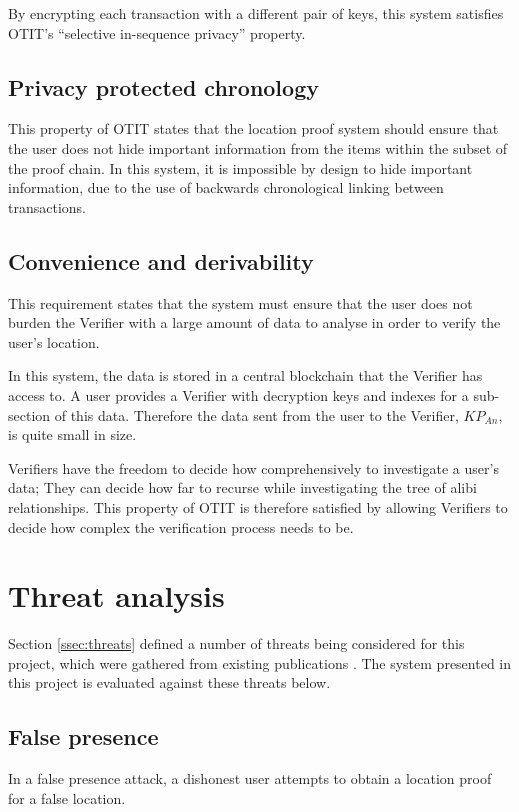 By encrypting each transaction with a different pair of keys, this system satisfies OTIT's ``selective in-sequence privacy'' property.

\subsection{Privacy protected chronology}
This property of OTIT states that the location proof system should ensure that the user does not hide important information from the items within the subset of the proof chain. In this system, it is impossible by design to hide important information, due to the use of backwards chronological linking between transactions. 

\subsection{Convenience and derivability}
This requirement states that the system must ensure that the user does not burden the Verifier with a large amount of data to analyse in order to verify the user's location.

In this system, the data is stored in a central blockchain that the Verifier has access to. A user provides a Verifier  with decryption keys and indexes for a sub-section of this data. Therefore the data sent from the user to the Verifier, $KP_{An}$, is quite small in size.

Verifiers have the freedom to decide how comprehensively to investigate a user's data; They can decide how far to recurse while investigating the tree of alibi relationships. This property of OTIT is therefore satisfied by allowing Verifiers to decide how complex the verification process needs to be.

\section{Threat analysis}
Section \ref{ssec:threats} defined a number of threats being considered for this project, which were gathered from existing publications \cite{luo,khan}. The system presented in this project is evaluated against these threats below.

\subsection{False presence}
In a false presence attack, a dishonest user attempts to obtain a location proof for a false location.

